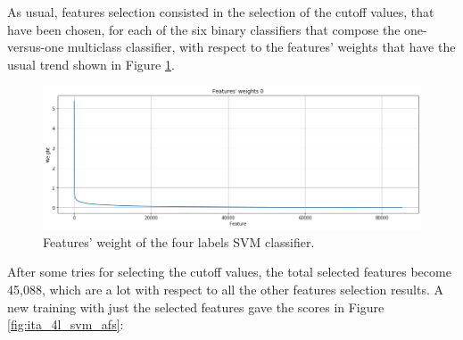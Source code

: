 As usual, features selection consisted in the selection of the cutoff values, that have been chosen, for each of the six binary classifiers that compose the one-versus-one multiclass classifier, with respect to the features' weights that have the usual trend shown in Figure \ref{fig:svm4l_fs_1}.
\begin{figure}[H]
	\centering
	\includegraphics[width=\textwidth]{figures/conf_matrices/ita_4l_svm/svm4l_fs_1.png}
	\caption{Features' weight of the four labels SVM classifier.}
	\label{fig:svm4l_fs_1}
\end{figure}


After some tries for selecting the cutoff values, the total selected features become 45,088, which are a lot with respect to all the other features selection results. A new training with just the selected features gave the scores in Figure \ref{fig:ita_4l_svm_afs}:

